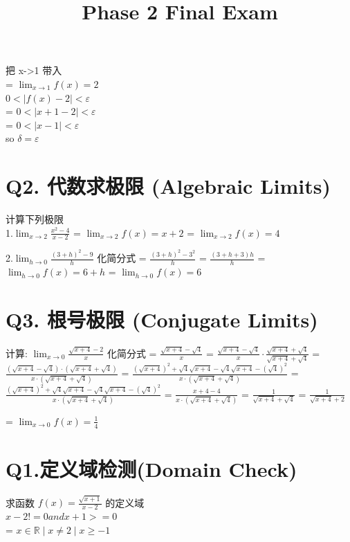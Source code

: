 \documentclass[12pt]{article}
\begin{document}
把 x->1 带入 \\
= $\lim_{x \to  1}f(x) = 2$ \\

$0 < |f(x) - 2| < ε$ \\
= $0 < |x + 1 - 2| < ε$ \\
= $0 < |x - 1 | < ε$ \\

so $ δ = ε $ \\


\section*{Q2. 代数求极限 (Algebraic Limits)}
计算下列极限 \\
1.$\lim_{x \to 2}\frac{x^{2}-4}{x-2}$
= $\lim_{x \to 2}f(x) = x + 2$
= $\lim_{x \to 2}f(x) = 4$

2.$\lim_{h \to 0}\frac{(3+h)^{2}-9}{h}$
化简分式
= $\frac{(3+h)^{2} - 3^{2}}{h}$
= $\frac{(3+h+3)h}{h}$
= $\lim_{h \to 0}f(x) = 6+h $
= $\lim_{h \to 0}f(x) = 6$

\section*{Q3. 根号极限 (Conjugate Limits)}
计算: $\lim_{x \to 0}{\frac{\sqrt{x+4}-2}{x}}$
化简分式
= $\frac{\sqrt{x+4}-\sqrt{4}}{x}$
= $\frac{\sqrt{x+4}-\sqrt{4}}{x} \cdot \frac{\sqrt{x+4}+\sqrt{4}}{\sqrt{x+4}+\sqrt{4}}$
= $\frac{(\sqrt{x+4}-\sqrt{4}) \cdot (\sqrt{x+4}+\sqrt{4})}{x \cdot (\sqrt{x+4}+\sqrt{4}) }$
= $\frac{(\sqrt{x+4})^{2} + \sqrt{4}\sqrt{x+4} -\sqrt{4}\sqrt{x+4} - (\sqrt{4})^{2}}{x \cdot (\sqrt{x+4}+\sqrt{4})}$
= $\frac{(\sqrt{x+4})^{2} + \sqrt{4}\sqrt{x+4} -\sqrt{4}\sqrt{x+4} - (\sqrt{4})^{2}}{x \cdot (\sqrt{x+4}+\sqrt{4})}$
= $\frac{x+4-4}{x \cdot (\sqrt{x+4}+\sqrt{4})}$
= $\frac{1}{\sqrt{x+4}+\sqrt{4}}$
= $\frac{1}{\sqrt{x+4}+2}$

= $\lim_{x \to 0}f(x) = \frac{1}{4}$


\title{Phase 2 Final Exam}

\section*{Q1.定义域检测(Domain Check)}
求函数 $f(x) = \frac{\sqrt{x+1}}{x-2}$ 的定义域\\
$x -2 ! = 0 and  x + 1 >=0 $ \\
= $x \in \mathbb{R} \mid x \neq 2  \mid  x \geq -1$\\
\end{document}
